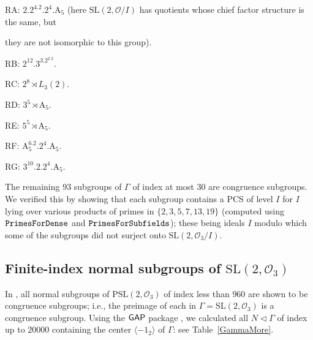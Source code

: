 \documentclass[11pt]{amsart}
\theoremstyle{definition}
\theoremstyle{remark}
\newcommand{\G}{{\Gamma}}
\newcommand{\SL}{\mathrm{SL}}
\newcommand{\PSL}{\mathrm{PSL}}
\begin{document}
RA: $2.2^4.2.2^4.\mathrm{A}_5$ (here $\SL(2,\mathcal{O}/I)$
 has quotients whose chief factor structure is the same, but 

they are not isomorphic to this group).

\vspace{3pt}

RB: $2^{12}.3^3.2^2.3$.

\vspace{3pt}


RC: $2^8\rtimes L_3(2)$.

\vspace{3pt}


RD: $3^5\rtimes \mathrm{A}_5$.

\vspace{3pt}


RE: $5^5\rtimes \mathrm{A}_5$.

\vspace{3pt}


RF: $\mathrm{A}_5^6.2.2^4.\mathrm{A}_5$.

\vspace{3pt}


RG: $3^{10}.2.2^4.\mathrm{A}_5$.

\medskip

The remaining $93$ subgroups of $\G$ of index at most $30$ 
are congruence subgroups. We verified this by showing that 
each subgroup contains a PCS of level $I$ for $I$ lying over various 
products of primes in $\{2,3,5,7,13,19\}$ (computed using 
 $\tt PrimesForDense$ and  $\tt PrimesForSubfields$); these 
being ideals $I$ modulo which some of the subgroups did not 
surject onto  $\SL(2,\mathcal{O}_3/I)$. 

\subsection{Finite-index normal subgroups of $\SL(2,\mathcal{O}_3)$}

In \cite{Alperin}, all normal subgroups of $\PSL(2, \mathcal{O}_3)$
of index less than $960$ are shown to be congruence subgroups; i.e., 
the preimage of each in $\G=\SL(2, \mathcal{O}_3)$ is a congruence 
subgroup. Using the ${\sf GAP}$ package \cite{LINS},
we calculated all $N\lhd \allowbreak \G$ of index up to $20000$ 
containing the center $\langle -1_2\rangle$ of $\Gamma$:
see Table~\ref{GammaMore}.
\end{document}
